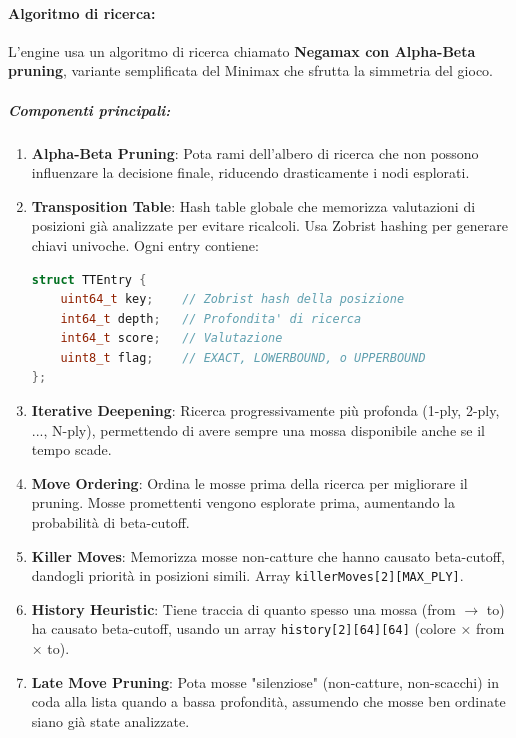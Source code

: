\paragraph{Algoritmo di ricerca:}

L'engine usa un algoritmo di ricerca chiamato \textbf{Negamax con Alpha-Beta pruning}, variante
semplificata del Minimax che sfrutta la simmetria del gioco.

\subparagraph{Componenti principali:}
\begin{enumerate}
  \item \textbf{Alpha-Beta Pruning}: Pota rami dell'albero di ricerca che non possono influenzare
        la decisione finale, riducendo drasticamente i nodi esplorati.

  \item \textbf{Transposition Table}: Hash table globale che memorizza valutazioni di posizioni
        già analizzate per evitare ricalcoli. Usa Zobrist hashing per generare chiavi univoche.
        Ogni entry contiene:
        \begin{lstlisting}[language=C++]
struct TTEntry {
    uint64_t key;    // Zobrist hash della posizione
    int64_t depth;   // Profondita' di ricerca
    int64_t score;   // Valutazione
    uint8_t flag;    // EXACT, LOWERBOUND, o UPPERBOUND
};
        \end{lstlisting}

  \item \textbf{Iterative Deepening}: Ricerca progressivamente più profonda (1-ply, 2-ply, ..., N-ply),
        permettendo di avere sempre una mossa disponibile anche se il tempo scade.

  \item \textbf{Move Ordering}: Ordina le mosse prima della ricerca per migliorare il pruning.
        Mosse promettenti vengono esplorate prima, aumentando la probabilità di beta-cutoff.

  \item \textbf{Killer Moves}: Memorizza mosse non-catture che hanno causato beta-cutoff,
        dandogli priorità in posizioni simili. Array \texttt{killerMoves[2][MAX\_PLY]}.

  \item \textbf{History Heuristic}: Tiene traccia di quanto spesso una mossa (from $\rightarrow$ to)
        ha causato beta-cutoff, usando un array \texttt{history[2][64][64]} (colore × from × to).

  \item \textbf{Late Move Pruning}: Pota mosse "silenziose" (non-catture, non-scacchi) in coda
        alla lista quando a bassa profondità, assumendo che mosse ben ordinate siano già state analizzate.
\end{enumerate}

